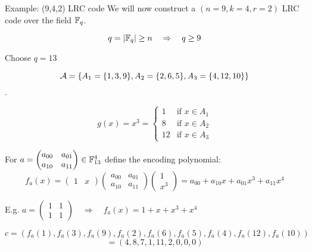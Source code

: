 \begin{frame}{Example: (9,4,2) LRC code}
        We will now construct a $(n=9, k=4, r=2)$ LRC code over the field $\mathbb{F}_q$.
        
        $$q = \vert \mathbb{F}_q \vert \geq n \quad \Rightarrow \quad q \geq 9$$
        
        Choose $q = 13$
        
        $$\mathcal{A} = \{ A_1 = \{1,3,9\}, A_2 = \{2,6,5 \}, A_3 = \{4,12,10 \} \}$$.
        
        $$g(x) = x^3 = 
        \begin{cases}
            1 & \mbox{if } x \in A_1 \\
            8 & \mbox{if } x \in A_2 \\
            12& \mbox{if } x \in A_3
        \end{cases}
        $$
    \end{frame}
    
    \begin{frame}
        For $a = 
        \begin{pmatrix}
            a_{00} & a_{01} \\
            a_{10} & a_{11}
        \end{pmatrix} \in \mathbb{F}_{13}^4$ define the encoding polynomial:
        $$f_a(x) =
        \begin{pmatrix}
            1 & x
        \end{pmatrix}
        \begin{pmatrix}
            a_{00} & a_{01} \\
            a_{10} & a_{11}
        \end{pmatrix}
        \begin{pmatrix}
            1 \\
            x^3
        \end{pmatrix} = a_{00} + a_{10}x + a_{01} x^3 + a_{11} x^4
        $$
        
        E.g. $a =         
        \begin{pmatrix}
            1 & 1 \\
            1 & 1
        \end{pmatrix}
        \quad \Rightarrow \quad f_a(x) = 1 + x + x^3 + x^4$
        
        $$c = (f_a(1), f_a(3), f_a(9), f_a(2), f_a(6), f_a(5), f_a(4), f_a(12), f_a(10))$$
        $$= (4,8,7,1,11,2,0,0,0)$$
    \end{frame}        
    
